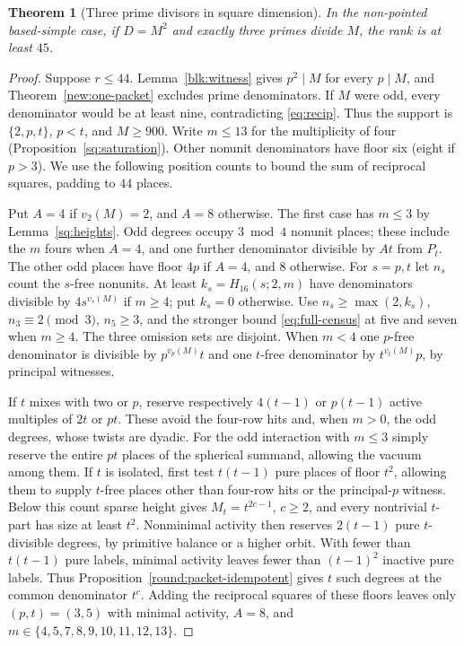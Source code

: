 \documentclass[11pt]{amsart}
\numberwithin{equation}{section}
\newtheorem{theorem}{Theorem}[section]
\theoremstyle{definition}
\theoremstyle{plain}
\begin{document}
\begin{theorem}[Three prime divisors in square dimension]\label{sq:three-prime-rank}
In the non-pointed based-simple case, if $D=M^2$ and exactly three
primes divide $M$, the rank is at least $45$.
\end{theorem}
\begin{proof}
Suppose $r\le44$. Lemma~\ref{blk:witness} gives $p^2\mid M$ for
every $p\mid M$, and Theorem~\ref{new:one-packet} excludes prime
denominators. If $M$ were odd, every denominator
would be at least nine, contradicting \eqref{eq:recip}. Thus the
support is $\{2,p,t\}$, $p<t$, and $M\ge900$. Write $m\le13$ for
the multiplicity of four (Proposition~\ref{sq:saturation}). Other nonunit denominators have floor six
(eight if $p>3$). We use the following position counts to bound the
sum of reciprocal squares, padding to $44$ places.

Put $A=4$ if $v_2(M)=2$, and $A=8$ otherwise. The first case has
$m\le3$ by Lemma~\ref{sq:heights}. Odd degrees occupy $3\bmod4$ nonunit places; these include
the $m$ fours when $A=4$, and one further denominator divisible by
$At$ from $P_t$. The other odd places have floor $4p$ if $A=4$,
and $8$ otherwise. For $s=p,t$ let $n_s$ count the $s$-free
nonunits. At least $k_s=H_{16}(s;2,m)$ have denominators divisible
by $4s^{v_s(M)}$ if $m\ge4$; put $k_s=0$ otherwise. Use
$n_s\ge\max(2,k_s)$, $n_3\equiv2\pmod3$, $n_5\ge3$, and the
stronger bound \eqref{eq:full-census} at five and seven when $m\ge4$.
The three omission sets are disjoint. When $m<4$ one $p$-free
denominator is divisible by $p^{v_p(M)}t$ and one $t$-free denominator
by $t^{v_t(M)}p$, by principal witnesses.

If $t$ mixes with two or $p$, reserve respectively $4(t-1)$ or
$p(t-1)$ active multiples of $2t$ or $pt$. These avoid the four-row
hits and, when $m>0$, the odd degrees, whose twists are dyadic. For
the odd interaction with $m\le3$ simply reserve the entire $pt$
places of the spherical summand, allowing the vacuum among them.
If $t$ is isolated, first test $t(t-1)$ pure places of floor $t^2$,
allowing them to supply $t$-free places other than four-row hits or
the principal-$p$ witness. Below this count sparse height gives
$M_t=t^{2c-1}$, $c\ge2$, and every nontrivial $t$-part has size
at least $t^2$. Nonminimal activity then reserves $2(t-1)$ pure
$t$-divisible degrees, by primitive balance or a higher orbit.
With fewer than $t(t-1)$ pure labels, minimal activity leaves fewer
than $(t-1)^2$ inactive pure labels. Thus Proposition~\ref{round:packet-idempotent} gives $t$
such degrees at the common denominator $t^c$.
Adding the reciprocal squares of these floors leaves only
$(p,t)=(3,5)$ with minimal activity, $A=8$, and
$m\in\{4,5,7,8,9,10,11,12,13\}$.


\end{proof}
\end{document}
